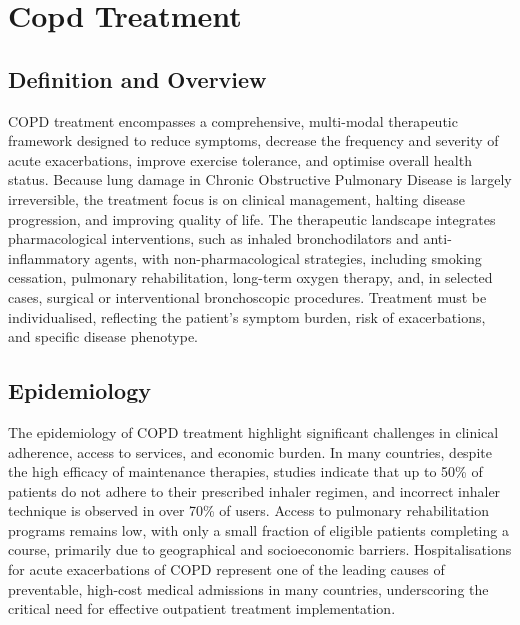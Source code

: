 \chapter{Copd Treatment}

\section*{Definition and Overview}
COPD treatment encompasses a comprehensive, multi-modal therapeutic framework designed to reduce symptoms, decrease the frequency and severity of acute exacerbations, improve exercise tolerance, and optimise overall health status. Because lung damage in Chronic Obstructive Pulmonary Disease is largely irreversible, the treatment focus is on clinical management, halting disease progression, and improving quality of life. The therapeutic landscape integrates pharmacological interventions, such as inhaled bronchodilators and anti-inflammatory agents, with non-pharmacological strategies, including smoking cessation, pulmonary rehabilitation, long-term oxygen therapy, and, in selected cases, surgical or interventional bronchoscopic procedures. Treatment must be individualised, reflecting the patient's symptom burden, risk of exacerbations, and specific disease phenotype.

\section*{Epidemiology}
The epidemiology of COPD treatment highlight significant challenges in clinical adherence, access to services, and economic burden. In many countries, despite the high efficacy of maintenance therapies, studies indicate that up to 50\% of patients do not adhere to their prescribed inhaler regimen, and incorrect inhaler technique is observed in over 70\% of users. Access to pulmonary rehabilitation programs remains low, with only a small fraction of eligible patients completing a course, primarily due to geographical and socioeconomic barriers. Hospitalisations for acute exacerbations of COPD represent one of the leading causes of preventable, high-cost medical admissions in many countries, underscoring the critical need for effective outpatient treatment implementation.


